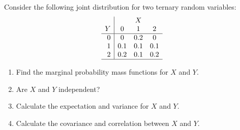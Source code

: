 \item Consider the following joint distribution for two ternary random variables:
\[  \begin{array}{r|ccc}
& \multicolumn{3}{c}{X} \\
Y & 0 & 1 & 2 \\
\hline
0 & 0 & 0.2 & 0 \\
1 & 0.1 & 0.1 & 0.1 \\
2 & 0.2 & 0.1 & 0.2 \\
\hline
\end{array} \]
\begin{enumerate}
\item Find the marginal probability mass functions for $X$ and $Y$.
\item Are $X$ and $Y$ independent?
\item Calculate the expectation and variance for $X$ and $Y$.
\item Calculate the covariance and correlation between $X$ and $Y$.
\end{enumerate}


